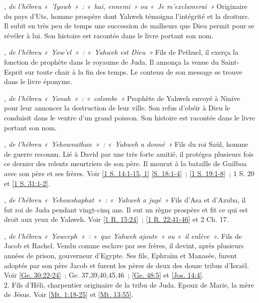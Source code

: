 \begin{multicols}{2}
\textit{, de l'hébreu «~'Iyowb~»~: «~haï, ennemi~» ou «~Je m'exclamerai~»}\newline
Originaire du pays d'Uts, homme prospère dont Yahweh témoigna l'intégrité et la droiture. Il subit en très peu de temps une succession de malheurs que Dieu permit pour se révéler à lui. Son histoire est racontée dans le livre portant son nom.

\textit{, de l'hébreu «~Yow'el~»~: «~Yahweh est Dieu~»}\newline
Fils de Pethuel, il exerça la fonction de prophète dans le royaume de Juda. Il annonça la venue du Saint-Esprit sur toute chair à la fin des temps. Le contenu de son message se trouve dans le livre éponyme.

\textit{, de l'hébreu «~Yonah~»~: «~colombe~»}\newline
Prophète de Yahweh envoyé à Ninive pour leur annoncer la destruction de leur ville. Son refus d'obéir à Dieu le conduisit dans le ventre d'un grand poisson. Son histoire est racontée dans le livre portant son nom.

\textit{, de l'hébreu «~Yehownathan~»~: «~Yahweh a donné~»}\newline
Fils du roi Saül, homme de guerre reconnu. Lié à David par une très forte amitié, il protégea plusieurs fois ce dernier des relents meurtriers de son père. Il mourut à la bataille de Guilboa avec son père et ses frères.\newline
Voir \vref{1 S. 14:1-15, 1} \vref{S. 18:1-4}~; \vref{1 S. 19:1-8}~; 1 S. 20 et \vref{1 S. 31:1-2}.

\textit{, de l'hébreu «~Yehowshaphat~»~: «~Yahweh a jugé~»}\newline
Fils d'Asa et d'Azuba, il fut roi de Juda pendant vingt-cinq ans. Il eut un règne prospère et fit ce qui est droit aux yeux de Yahweh. Voir \vref{1 R. 15:24}~; \vref{1 R. 22:41-46} et 2 Ch. 17.

\textit{, de l'hébreu «~Yowceph~»~: «~que Yahweh ajoute~» ou «~il enlève~»}. Fils de Jacob et Rachel. Vendu comme esclave par ses frères, il devint, après plusieurs années de prison, gouverneur d'Egypte. Ses fils, Ephraïm et Manasée, furent adoptés par son père Jacob et furent les pères de deux des douze tribus d'Israël. Voir \vref{Ge. 30:22-24}~; Ge. 37,39,40,45,46~; \vref{Ge. 48:5} et \vref{Jos. 14:4}.
\\2. Fils d'Héli, charpentier originaire de la tribu de Juda. Epoux de Marie, la mère de Jésus. Voir \vref{Mt. 1:18-25} et \vref{Mt. 13:55}.


\end{multicols}
